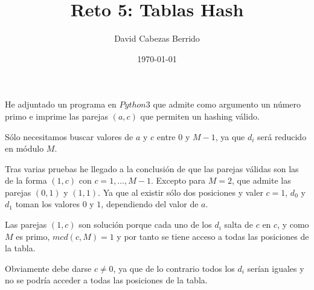 \documentclass{article}
\begin{document}
\title{Reto 5: Tablas Hash}
\author{David Cabezas Berrido}
\date{\today}
\maketitle

\begin{justify}
  He adjuntado un programa en $Python3$ que admite como
  argumento un número primo e imprime las parejas $(a, c)$ que
  permiten un hashing válido.
\end{justify}

\begin{justify}
  Sólo necesitamos buscar valores de $a$ y $c$ entre $0$ y $M-1$, ya
  que $d_i$ será reducido en módulo $M$.
\end{justify}

\begin{justify}
  Tras varias pruebas he llegado a la conclusión de que las parejas
  válidas son las de la forma $(1, c)$ con $c = 1,\ldots,M-1$. Excepto
  para $M = 2$, que admite las parejas $(0,1)$ y $(1,1)$. Ya que al
  existir sólo dos posiciones y valer $c = 1$, $d_0$ y $d_1$ toman los
  valores $0$ y $1$, dependiendo del valor de $a$.
\end{justify}

\begin{justify}
  Las parejas $(1, c)$ son solución porque cada uno de los $d_i$
  salta de $c$ en $c$, y como $M$ es primo, $mcd(c,M)=1$ y por
  tanto se tiene acceso a todas las posiciones de la tabla.
\end{justify}

\begin{justify}
  Obviamente debe darse $c \neq 0$, ya que de lo contrario todos los
  $d_i$ serían iguales y no se podría acceder a todas las posiciones
  de la tabla.
\end{justify}
\end{document}
